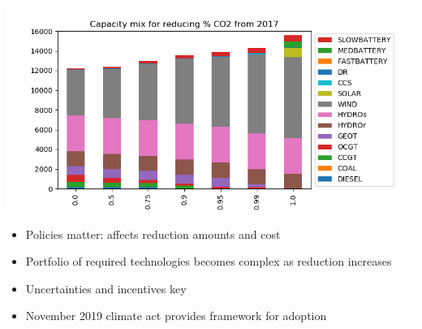\documentclass[xcolor=dvipsnames]{beamer}
\newcommand{\exclude}[1]{}
\begin{document}
\begin{frame}
\begin{columns}[T]
    \begin{column}{0.55\linewidth}
      \includegraphics[width=\textwidth]{includes/Sco2rednv20.png}
      \begin{itemize}
      \item Policies matter: affects reduction amounts and cost
      \item Portfolio of required technologies becomes complex as
        reduction increases
      \item Uncertainties and incentives key
      \item November 2019 climate act provides framework for adoption
      \end{itemize}
    \end{column}
  \end{columns}

\end{frame}

\exclude{
    Who are we, what are we doing.

  If we think of the goal for this talk as two-fold:  1) to describe
  WEREWOLF and 2) to pique their interest to participate in the policy
  discussion.

I would recommend to keep it high-level description to start and focus on the value proposition to ask them for their involvement.  They can ask you more detailed questions about the model in the Q\&A afterwards if they are interested.

I like the flow so far and the outputs in slides 6-10.  Although, I think we don't need to show them outputs for this meeting, as it is more of a briefing on WEREWOLF, where we are going with it and inviting them to participate if they are interested.

To gather their interest, we should focus on the value proposition for WEREWOLF to help guide government policy and, to some extent, utility investment decisions based on that policy.
}
\end{document}
